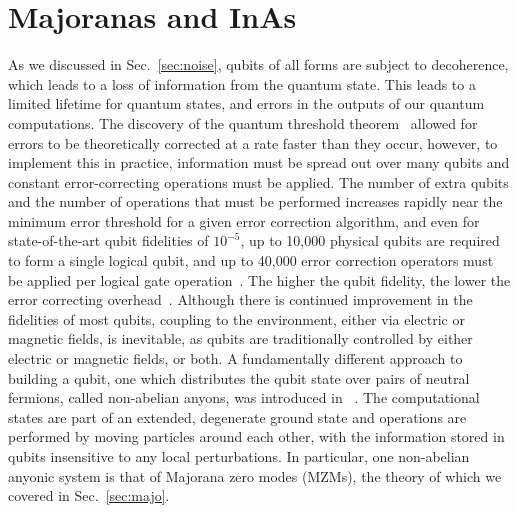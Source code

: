\chapter{Majoranas and InAs}
\label{sec:majoinas}

As we discussed in Sec.~\ref{sec:noise}, qubits of all forms are subject to decoherence, which leads to a loss of information
from the quantum state. This leads to a limited lifetime for quantum states, and errors in the outputs of our quantum computations.
The discovery of the quantum threshold theorem~\cite{1996quant.ph.11025A,doi:10.1098/rspa.1998.0167} allowed for errors to be theoretically corrected
at a rate faster than they occur, however, to implement this in practice, information must be spread out over many qubits and constant error-correcting
operations must be applied. The number of extra qubits and the number of operations that must be performed increases rapidly near the minimum error threshold for
a given error correction algorithm, and even for state-of-the-art qubit fidelities of $10^{-5}$, up to 10,000 physical qubits are required
to form a single logical qubit, and up to 40,000 error correction operators must be applied per logical gate operation~\cite{6657074}.
The higher the qubit fidelity, the lower the error correcting overhead~\cite{nature23460}. Although there is continued improvement in the fidelities
of most qubits, coupling to the environment, either via electric or magnetic fields, is inevitable, as qubits are traditionally controlled
by either electric or magnetic fields, or both. A fundamentally different approach to building a qubit, one which distributes the qubit state over pairs of
neutral fermions, called non-abelian anyons, was introduced in ~\cite{RevModPhys.80.1083}. The computational states are part of an extended,
degenerate ground state and operations are performed by moving particles around each other, with the information stored in qubits insensitive
to any local perturbations. In particular, one non-abelian anyonic system is that of Majorana zero modes (MZMs), the theory of which we covered in
Sec.~\ref{sec:majo}.

